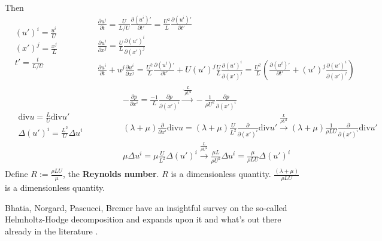 \documentclass[twoside,landscape,10pt]{amsart}
\theoremstyle{plain}
\theoremstyle{definition}
\theoremstyle{remark}
\theoremstyle{remark}
\begin{document}
\begin{multicols*}{2}
Then
\[
\begin{aligned}
  & (u')^i = \frac{u^i}{U} \\ 
  & (x')^j = \frac{x^j}{L} \\ 
  & t' = \frac{t}{ L/U}
\end{aligned} \quad \quad \quad \, \begin{aligned}
  & \frac{ \partial u^i}{ \partial t} = \frac{U}{ L/U} \frac{ \partial (u^i)' }{ \partial t'} = \frac{U^2}{L} \frac{ \partial (u^i)' }{ \partial t' } \\ 
  & \frac{ \partial u^i }{ \partial x^j} = \frac{U}{L} \frac{ \partial (u')^i }{ \partial (x')^j } \\
  & \frac{ \partial u^i}{ \partial t} + u^j \frac{ \partial u^i}{ \partial x^j} = \frac{U^2}{L} \frac{ \partial (u^i)' }{ \partial t' } + U (u')^j \frac{U}{L} \frac{ \partial (u')^i }{ \partial (x')^j } = \frac{U^2}{L} \left( \frac{ \partial (u^i)' }{ \partial t' } + (u')^j \frac{ \partial (u')^i }{ \partial (x')^j } \right)
\end{aligned}
\]
\[
\begin{gathered}
  \begin{aligned}
    & \text{div}u = \frac{L}{U} \text{div}u' \\ 
    & \Delta (u')^i = \frac{L^2}{U} \Delta u^i
  \end{aligned} \quad \quad \quad \, \begin{aligned} 
    & - \frac{ \partial p}{ \partial x^i} = \frac{-1}{L} \frac{ \partial p}{ \partial (x')^i } \xrightarrow{ \cdot \frac{L}{ \rho U^2} } -\frac{1}{ \rho U^2} \frac{ \partial p }{ \partial (x')^i } \\
    & (\lambda + \mu) \frac{ \partial }{ \partial x^i} \text{div}u = (\lambda + \mu) \frac{U}{L^2} \frac{ \partial }{ \partial (x')^i } \text{div}u' \xrightarrow{ \frac{L}{ \rho U^2} } (\lambda + \mu ) \frac{1}{ \rho LU } \frac{ \partial }{ \partial (x')^i } \text{div}u' \\
    & \mu \Delta u^i = \mu \frac{U}{ L^2} \Delta (u')^i \xrightarrow{ \frac{L}{ \rho U^2} } \frac{ \mu L}{ \rho U^2} \Delta u^i = \frac{ \mu }{ \rho LU} \Delta(u')^i
\end{aligned}
\end{gathered}
\]
Define $R:= \frac{ \rho LU }{ \mu }$, the \textbf{Reynolds number}.  $R$ is a dimensionless quantity.  $\frac{(\lambda + \mu )}{ \rho L U}$ is a dimensionless quantity.  

Bhatia, Norgard, Pascucci, Bremer have an insightful survey on the so-called Helmholtz-Hodge decomposition and expands upon it and what's out there already in the literature \cite{HBhatiaGNorgardVPascucciPBremer2013}.  






\end{multicols*}
\end{document}

